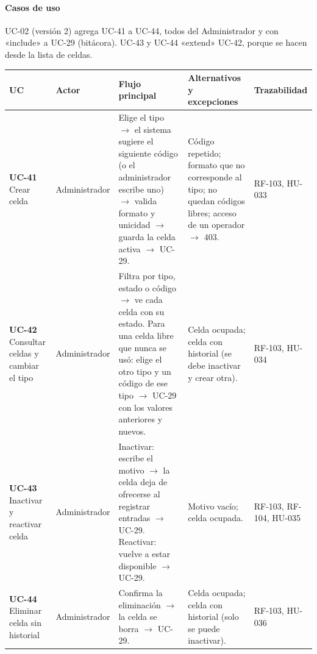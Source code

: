 \paragraph{Casos de uso}

UC-02 (versión 2) agrega UC-41 a UC-44, todos del Administrador y con «include» a UC-29 (bitácora). UC-43 y UC-44 «extend» UC-42, porque se hacen desde la lista de celdas.


\begin{longtable}{>{\raggedright\arraybackslash}p{1.9cm}>{\raggedright\arraybackslash}p{2.6cm}>{\raggedright\arraybackslash}p{3.7cm}>{\raggedright\arraybackslash}p{3.8cm}>{\raggedright\arraybackslash}p{2.4000000000000004cm}}
\toprule
\textbf{UC} & \textbf{Actor} & \textbf{Flujo principal} & \textbf{Alternativos y excepciones} & \textbf{Trazabilidad}\\
\midrule\endhead
\textbf{UC-41} Crear celda & Administrador & Elige el tipo $\rightarrow$ el sistema sugiere el siguiente código (o el administrador escribe uno) $\rightarrow$ valida formato y unicidad $\rightarrow$ guarda la celda activa $\rightarrow$ UC-29. & Código repetido; formato que no corresponde al tipo; no quedan códigos libres; acceso de un operador $\rightarrow$ 403. & RF-103, HU-033\\
\textbf{UC-42} Consultar celdas y cambiar el tipo & Administrador & Filtra por tipo, estado o código $\rightarrow$ ve cada celda con su estado. Para una celda libre que nunca se usó: elige el otro tipo y un código de ese tipo $\rightarrow$ UC-29 con los valores anteriores y nuevos. & Celda ocupada; celda con historial (se debe inactivar y crear otra). & RF-103, HU-034\\
\textbf{UC-43} Inactivar y reactivar celda & Administrador & Inactivar: escribe el motivo $\rightarrow$ la celda deja de ofrecerse al registrar entradas $\rightarrow$ UC-29. Reactivar: vuelve a estar disponible $\rightarrow$ UC-29. & Motivo vacío; celda ocupada. & RF-103, RF-104, HU-035\\
\textbf{UC-44} Eliminar celda sin historial & Administrador & Confirma la eliminación $\rightarrow$ la celda se borra $\rightarrow$ UC-29. & Celda ocupada; celda con historial (solo se puede inactivar). & RF-103, HU-036\\
\bottomrule
\end{longtable}



